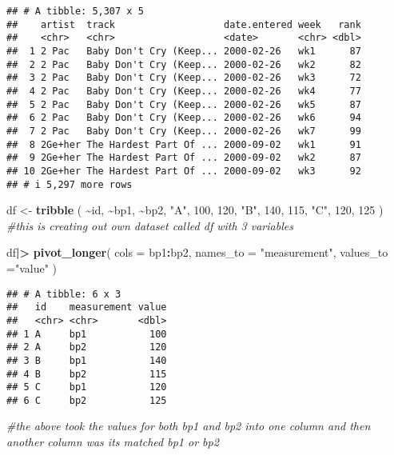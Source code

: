 \documentclass[
]{article}
\newenvironment{Shaded}{\begin{snugshade}}{\end{snugshade}}
\newcommand{\AttributeTok}[1]{\textcolor[rgb]{0.13,0.29,0.53}{#1}}
\newcommand{\CommentTok}[1]{\textcolor[rgb]{0.56,0.35,0.01}{\textit{#1}}}
\newcommand{\DecValTok}[1]{\textcolor[rgb]{0.00,0.00,0.81}{#1}}
\newcommand{\FunctionTok}[1]{\textcolor[rgb]{0.13,0.29,0.53}{\textbf{#1}}}
\newcommand{\NormalTok}[1]{#1}
\newcommand{\OtherTok}[1]{\textcolor[rgb]{0.56,0.35,0.01}{#1}}
\newcommand{\SpecialCharTok}[1]{\textcolor[rgb]{0.81,0.36,0.00}{\textbf{#1}}}
\newcommand{\StringTok}[1]{\textcolor[rgb]{0.31,0.60,0.02}{#1}}
\begin{document}
\begin{verbatim}
## # A tibble: 5,307 x 5
##    artist  track                   date.entered week   rank
##    <chr>   <chr>                   <date>       <chr> <dbl>
##  1 2 Pac   Baby Don't Cry (Keep... 2000-02-26   wk1      87
##  2 2 Pac   Baby Don't Cry (Keep... 2000-02-26   wk2      82
##  3 2 Pac   Baby Don't Cry (Keep... 2000-02-26   wk3      72
##  4 2 Pac   Baby Don't Cry (Keep... 2000-02-26   wk4      77
##  5 2 Pac   Baby Don't Cry (Keep... 2000-02-26   wk5      87
##  6 2 Pac   Baby Don't Cry (Keep... 2000-02-26   wk6      94
##  7 2 Pac   Baby Don't Cry (Keep... 2000-02-26   wk7      99
##  8 2Ge+her The Hardest Part Of ... 2000-09-02   wk1      91
##  9 2Ge+her The Hardest Part Of ... 2000-09-02   wk2      87
## 10 2Ge+her The Hardest Part Of ... 2000-09-02   wk3      92
## # i 5,297 more rows
\end{verbatim}

\begin{Shaded}
\begin{Highlighting}[]
\NormalTok{df }\OtherTok{\textless{}{-}} \FunctionTok{tribble}\NormalTok{ (}
  \SpecialCharTok{\textasciitilde{}}\NormalTok{id, }\SpecialCharTok{\textasciitilde{}}\NormalTok{bp1, }\SpecialCharTok{\textasciitilde{}}\NormalTok{bp2,}
  \StringTok{"A"}\NormalTok{, }\DecValTok{100}\NormalTok{, }\DecValTok{120}\NormalTok{,}
  \StringTok{"B"}\NormalTok{, }\DecValTok{140}\NormalTok{, }\DecValTok{115}\NormalTok{,}
  \StringTok{"C"}\NormalTok{, }\DecValTok{120}\NormalTok{, }\DecValTok{125}
\NormalTok{)}
\CommentTok{\#this is creating out own dataset called df with 3 variables}

\NormalTok{df}\SpecialCharTok{|\textgreater{}}
  \FunctionTok{pivot\_longer}\NormalTok{(}
    \AttributeTok{cols =}\NormalTok{ bp1}\SpecialCharTok{:}\NormalTok{bp2,}
    \AttributeTok{names\_to =} \StringTok{"measurement"}\NormalTok{,}
    \AttributeTok{values\_to =}\StringTok{"value"}
\NormalTok{  )}
\end{Highlighting}
\end{Shaded}

\begin{verbatim}
## # A tibble: 6 x 3
##   id    measurement value
##   <chr> <chr>       <dbl>
## 1 A     bp1           100
## 2 A     bp2           120
## 3 B     bp1           140
## 4 B     bp2           115
## 5 C     bp1           120
## 6 C     bp2           125
\end{verbatim}

\begin{Shaded}
\begin{Highlighting}[]
\CommentTok{\#the above took the values for both bp1 and bp2 into one column and then another column was its matched bp1 or bp2}
\end{Highlighting}
\end{Shaded}
\end{document}

